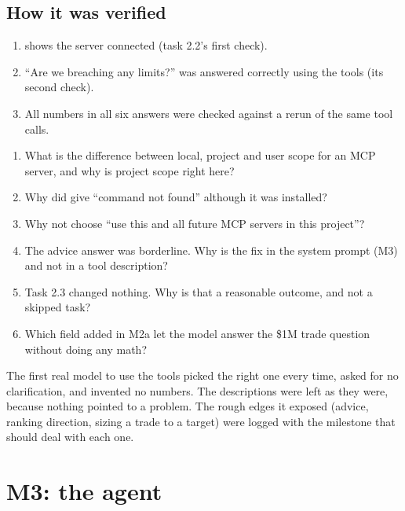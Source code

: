 \documentclass[11pt]{article}
\newcommand{\code}[1]{\texttt{\detokenize{#1}}}
\begin{document}
\subsection{How it was verified}

\begin{enumerate}
  \item \code{claude mcp list} shows the server connected (task 2.2's first check).
  \item ``Are we breaching any limits?'' was answered correctly using the tools (its second
        check).
  \item All numbers in all six answers were checked against a rerun of the same tool calls.
\end{enumerate}

\begin{reviewq}
\begin{enumerate}
  \item What is the difference between local, project and user scope for an MCP server, and
        why is project scope right here?
  \item Why did \code{claude} give ``command not found'' although it was installed?
  \item Why not choose ``use this and all future MCP servers in this project''?
  \item The advice answer was borderline. Why is the fix in the system prompt (M3) and not
        in a tool description?
  \item Task 2.3 changed nothing. Why is that a reasonable outcome, and not a skipped task?
  \item Which field added in M2a let the model answer the \$1M trade question without doing
        any math?
\end{enumerate}
\end{reviewq}

\begin{takeaway}
The first real model to use the tools picked the right one every time, asked for no
clarification, and invented no numbers. The descriptions were left as they were, because
nothing pointed to a problem. The rough edges it exposed (advice, ranking direction, sizing a
trade to a target) were logged with the milestone that should deal with each one.
\end{takeaway}

\section{M3: the agent}
\end{document}
